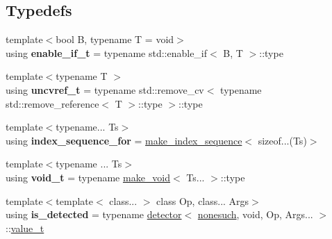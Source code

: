 \subsection*{Typedefs}
\begin{DoxyCompactItemize}
\item 
\mbox{\label{namespacenlohmann_1_1detail_a02bcbc878bee413f25b985ada771aa9c}} 
{\footnotesize template$<$bool B, typename T  = void$>$ }\\using {\bfseries enable\+\_\+if\+\_\+t} = typename std\+::enable\+\_\+if$<$ B, T $>$\+::type
\item 
\mbox{\label{namespacenlohmann_1_1detail_a53a082eedad9f4729fcd8fed552a21f7}} 
{\footnotesize template$<$typename T $>$ }\\using {\bfseries uncvref\+\_\+t} = typename std\+::remove\+\_\+cv$<$ typename std\+::remove\+\_\+reference$<$ T $>$\+::type $>$\+::type
\item 
\mbox{\label{namespacenlohmann_1_1detail_a24800493c6ec02ce033dcbb47b7fd28e}} 
{\footnotesize template$<$typename... Ts$>$ }\\using {\bfseries index\+\_\+sequence\+\_\+for} = \mbox{\hyperlink{structnlohmann_1_1detail_1_1make__index__sequence}{make\+\_\+index\+\_\+sequence}}$<$ sizeof...(Ts)$>$
\item 
\mbox{\label{namespacenlohmann_1_1detail_a92a167c49c6697b6ffe4f79492c705e5}} 
{\footnotesize template$<$typename ... Ts$>$ }\\using {\bfseries void\+\_\+t} = typename \mbox{\hyperlink{structnlohmann_1_1detail_1_1make__void}{make\+\_\+void}}$<$ Ts... $>$\+::type
\item 
\mbox{\label{namespacenlohmann_1_1detail_a9135fcf616d6ac6e231a86e0a055ac44}} 
{\footnotesize template$<$template$<$ class... $>$ class Op, class... Args$>$ }\\using {\bfseries is\+\_\+detected} = typename \mbox{\hyperlink{structnlohmann_1_1detail_1_1detector}{detector}}$<$ \mbox{\hyperlink{structnlohmann_1_1detail_1_1nonesuch}{nonesuch}}, void, Op, Args... $>$\+::\mbox{\hyperlink{namespacenlohmann_1_1detail_a1ed8fc6239da25abcaf681d30ace4985}{value\+\_\+t}}
\item 

\end{DoxyCompactItemize}

